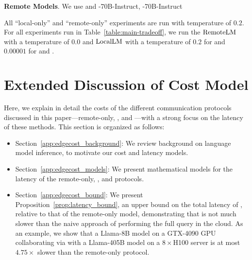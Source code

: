 \textbf{Remote Models}. We use \gpt and \llamathreetwo-70B-Instruct, \llamathreeone-70B-Instruct

All ``local-only'' and ``remote-only'' experiments are run with temperature of $0.2$. For all \system experiments run in Table~\ref{table:main-tradeoff}, we run the $\mathrm{RemoteLM}$ with a temperature of $0.0$ and $\mathrm{LocalLM}$ with a temperature of $0.2$ for \finance and $0.00001$ for \qasper and \longhealth. 





\section{Extended Discussion of Cost Model}
\label{app:edgecost}
Here, we explain in detail the costs of the different communication protocols discussed in this paper---remote-only, \naive, and \system---with a strong focus on the latency of these methods.
This section is organized as follows:
\begin{itemize}
    \item Section~\ref{app:edgecost_background}: We review background on language model inference, to motivate our cost and latency models.
    \item Section~\ref{app:edgecost_models}: We present mathematical models for the latency of the remote-only, \naive, and \system protocols.
    \item Section~\ref{app:edgecost_bound}: We present Proposition~\ref{prop:latency_bound}, an upper bound on the total latency of \system, relative to that of the remote-only model, demonstrating that \system is not much slower than the naive approach of performing the full query in the cloud.
    As an example, we show that a Llama-8B model on a GTX-4090 GPU collaborating via \system with a Llama-405B model on a $8\times$H100 server is at most $4.75\times$ slower than the remote-only protocol.
\end{itemize}


